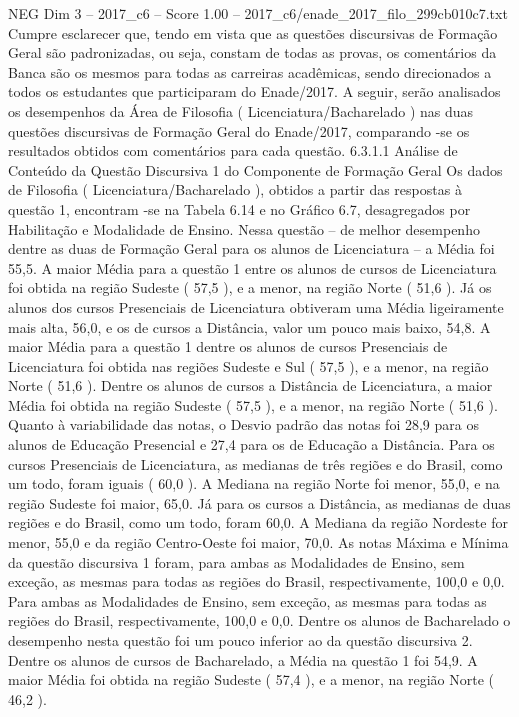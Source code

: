 \begin{textsample}{NEG Dim 3 – 2017\_c6 – Score 1.00 – 2017\_c6/enade\_2017\_filo\_299cb010c7.txt}
Cumpre esclarecer que, tendo em vista que as questões discursivas de Formação Geral são padronizadas, ou seja, constam de todas as provas, os comentários da Banca são os mesmos para todas as carreiras acadêmicas, sendo direcionados a todos os estudantes que participaram do Enade/2017.
A seguir, serão analisados os desempenhos da Área de Filosofia ( Licenciatura/Bacharelado ) nas duas questões discursivas de Formação Geral do Enade/2017, comparando -se os resultados obtidos com comentários para cada questão. 6.3.1.1 Análise de Conteúdo da Questão Discursiva 1 do Componente de Formação Geral Os dados de Filosofia ( Licenciatura/Bacharelado ), obtidos a partir das respostas à questão 1, encontram -se na Tabela 6.14 e no Gráfico 6.7, desagregados por Habilitação e Modalidade de Ensino.
Nessa questão – de melhor desempenho dentre as duas de Formação Geral para os alunos de Licenciatura – a Média foi 55,5.
A maior Média para a questão 1 entre os alunos de cursos de Licenciatura foi obtida na região Sudeste ( 57,5 ), e a menor, na região Norte ( 51,6 ).
Já os alunos dos cursos Presenciais de Licenciatura obtiveram uma Média ligeiramente mais alta, 56,0, e os de cursos a Distância, valor um pouco mais baixo, 54,8.
A maior Média para a questão 1 dentre os alunos de cursos Presenciais de Licenciatura foi obtida nas regiões Sudeste e Sul ( 57,5 ), e a menor, na região Norte ( 51,6 ).
Dentre os alunos de cursos a Distância de Licenciatura, a maior Média foi obtida na região Sudeste ( 57,5 ), e a menor, na região Norte ( 51,6 ).
Quanto à variabilidade das notas, o Desvio padrão das notas foi 28,9 para os alunos de Educação Presencial e 27,4 para os de Educação a Distância.
Para os cursos Presenciais de Licenciatura, as medianas de três regiões e do Brasil, como um todo, foram iguais ( 60,0 ).
A Mediana na região Norte foi menor, 55,0, e na região Sudeste foi maior, 65,0.
Já para os cursos a Distância, as medianas de duas regiões e do Brasil, como um todo, foram 60,0.
A Mediana da região Nordeste for menor, 55,0 e da região Centro-Oeste foi maior, 70,0.
As notas Máxima e Mínima da questão discursiva 1 foram, para ambas as Modalidades de Ensino, sem exceção, as mesmas para todas as regiões do Brasil, respectivamente, 100,0 e 0,0.
Para ambas as Modalidades de Ensino, sem exceção, as mesmas para todas as regiões do Brasil, respectivamente, 100,0 e 0,0.
Dentre os alunos de Bacharelado o desempenho nesta questão foi um pouco inferior ao da questão discursiva 2.
Dentre os alunos de cursos de Bacharelado, a Média na questão 1 foi 54,9.
A maior Média foi obtida na região Sudeste ( 57,4 ), e a menor, na região Norte ( 46,2 ).

\end{textsample}
